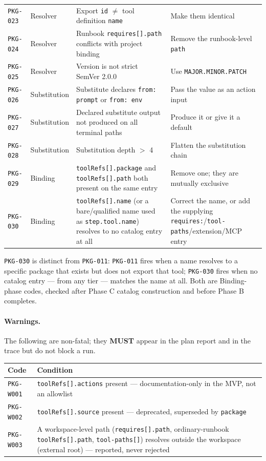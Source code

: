 \begin{center}
\begin{tabular}{p{2.3cm}p{1.9cm}p{6.3cm}p{3.6cm}}
\texttt{PKG-023} & Resolver & Export \texttt{id} $\neq$ tool definition \texttt{name} & Make them identical \\
\texttt{PKG-024} & Resolver & Runbook \texttt{requires[].path} conflicts with project binding & Remove the runbook-level \texttt{path} \\
\texttt{PKG-025} & Resolver & Version is not strict SemVer 2.0.0 & Use \texttt{MAJOR.MINOR.PATCH} \\
\texttt{PKG-026} & Substitution & Substitute declares \texttt{from: prompt} or \texttt{from: env} & Pass the value as an action input \\
\texttt{PKG-027} & Substitution & Declared substitute output not produced on all terminal paths & Produce it or give it a default \\
\texttt{PKG-028} & Substitution & Substitution depth $>$ 4 & Flatten the substitution chain \\
\texttt{PKG-029} & Binding & \texttt{toolRefs[].package} and \texttt{toolRefs[].path} both present on the same entry & Remove one; they are mutually exclusive \\
\texttt{PKG-030} & Binding & \texttt{toolRefs[].name} (or a bare/qualified name used as \texttt{step.tool.name}) resolves to no catalog entry at all & Correct the name, or add the supplying \texttt{requires:}/\texttt{tool-paths}/extension/MCP entry \\
\hline
\end{tabular}
\end{center}

\texttt{PKG-030} is distinct from \texttt{PKG-011}: \texttt{PKG-011} fires
when a name resolves to a specific package that exists but does not export
that tool; \texttt{PKG-030} fires when no catalog entry --- from any tier ---
matches the name at all. Both are Binding-phase codes, checked after Phase C
catalog construction and before Phase B completes.

\paragraph{Warnings.} The following are non-fatal; they \textbf{MUST} appear
in the plan report and in the trace but do not block a run.

\begin{center}\small
\begin{tabular}{p{2.8cm}p{10.5cm}}
\hline
\textbf{Code} & \textbf{Condition} \\
\hline
\texttt{PKG-W001} & \texttt{toolRefs[].actions} present --- documentation-only in the MVP, not an allowlist \\
\texttt{PKG-W002} & \texttt{toolRefs[].source} present --- deprecated, superseded by \texttt{package} \\
\texttt{PKG-W003} & A workspace-level path (\texttt{requires[].path}, ordinary-runbook \texttt{toolRefs[].path}, \texttt{tool-paths[]}) resolves outside the workspace (external root) --- reported, never rejected \\
\hline
\end{tabular}
\end{center}

